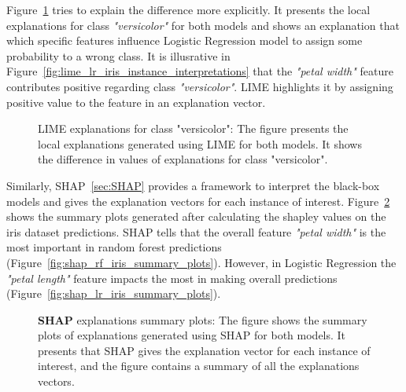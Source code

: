 \documentclass[english]{tktltiki2}
\theoremstyle{definition}
\theoremstyle{remark}
\begin{document}
Figure~\ref{fig:lime_iris_instance_interpretations} tries to explain the difference more explicitly. It presents the local explanations for class \textit{"versicolor"}
for both models and shows an explanation that which specific features influence Logistic Regression model to assign some probability to a wrong class. It is illusrative in Figure~\ref{fig:lime_lr_iris_instance_interpretations} that the \textit{"petal width"} feature contributes positive regarding class \textit{"versicolor"}. LIME highlights it by assigning positive value to the feature in an explanation vector.
\begin{figure}[H]
	\vspace*{0mm}
	\centering
	\qquad
	\caption{LIME explanations for class "versicolor": The figure presents the local explanations generated using LIME for both models. It shows the difference in values of explanations for class "versicolor".}%
	\label{fig:lime_iris_instance_interpretations}%
\end{figure}


Similarly, SHAP~\ref{sec:SHAP} provides a framework to interpret the black-box models and gives the explanation vectors for each instance of interest. Figure~\ref{fig:shap_iris_summary_plots} shows the summary plots generated after calculating the shapley values on the iris dataset predictions. SHAP tells that the overall feature \textit{"petal width"} is the most important in random forest predictions (Figure~\ref{fig:shap_rf_iris_summary_plots}). However, in Logistic Regression the \textit{"petal length"} feature impacts the most in making overall predictions (Figure~\ref{fig:shap_lr_iris_summary_plots}). 
\begin{figure}[H]
	\vspace*{0mm}
	\centering
	\qquad
	\caption{\textbf{SHAP} explanations summary plots: The figure shows the summary plots of explanations generated using SHAP for both models. It presents that SHAP gives the explanation vector for each instance of interest, and the figure contains a summary of all the explanations vectors.}%
	\label{fig:shap_iris_summary_plots}%
\end{figure}
\end{document}
